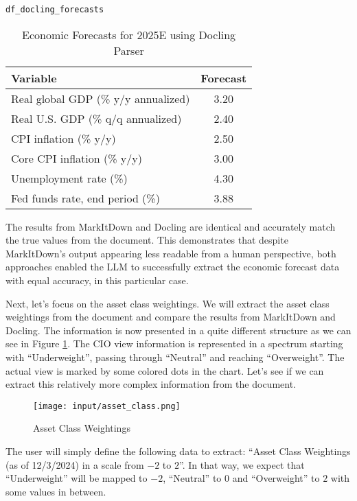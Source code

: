 \begin{verbatim}
df_docling_forecasts
\end{verbatim}

\begin{table}[h!]
\centering
\caption{Economic Forecasts for 2025E using Docling Parser}
\begin{tabular}{lc}
\hline
\textbf{Variable} & \textbf{Forecast} \\
\hline
Real global GDP (\% y/y annualized) & 3.20 \\
Real U.S. GDP (\% q/q annualized) & 2.40 \\
CPI inflation (\% y/y) & 2.50 \\
Core CPI inflation (\% y/y) & 3.00 \\
Unemployment rate (\%) & 4.30 \\
Fed funds rate, end period (\%) & 3.88 \\
\hline
\end{tabular}
\label{tab:docling-forecasts}
\end{table}


The results from MarkItDown and Docling are identical and accurately match the true values from the document. This demonstrates that despite MarkItDown's output appearing less readable from a human perspective, both approaches enabled the LLM to successfully extract the economic forecast data with equal accuracy, in this particular case.

Next, let's focus on the asset class weightings. We will extract the asset class weightings from the document and compare the results from MarkItDown and Docling. The information is now presented in a quite different structure as we can see in Figure \ref{fig:asset_class}. The CIO view information is represented in a spectrum starting with ``Underweight'', passing through ``Neutral'' and reaching ``Overweight''. The actual view is marked by some colored dots in the chart. Let's see if we can extract this relatively more complex information from the document.

\begin{figure}[H]
\centering
\texttt{[image: input/asset\_class.png]}
\caption{Asset Class Weightings}
\label{fig:asset_class}
\end{figure}

The user will simply define the following data to extract: ``Asset Class Weightings (as of 12/3/2024) in a scale from $-2$ to $2$''. In that way, we expect that ``Underweight'' will be mapped to $-2$, ``Neutral'' to $0$ and ``Overweight'' to $2$ with some values in between.


